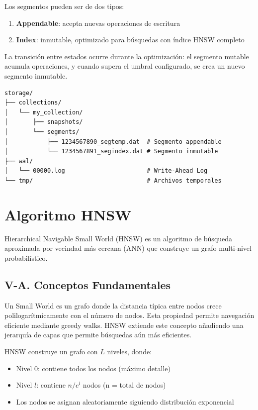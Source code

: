 \documentclass[conference]{IEEEtran}
\begin{document}
Los segmentos pueden ser de dos tipos:

\begin{enumerate}
    \item \textbf{Appendable}: acepta nuevas operaciones de escritura
    \item \textbf{Index}: inmutable, optimizado para búsquedas con índice HNSW completo
\end{enumerate}

La transición entre estados ocurre durante la optimización: el segmento mutable acumula operaciones, y cuando supera el umbral configurado, se crea un nuevo segmento inmutable.

\begin{lstlisting}[caption={Estructura de archivos en disco}]
storage/
├── collections/
│   └── my_collection/
│       ├── snapshots/
│       └── segments/
│           ├── 1234567890_segtemp.dat  # Segmento appendable
│           └── 1234567891_segindex.dat # Segmento inmutable
├── wal/
│   └── 00000.log                       # Write-Ahead Log
└── tmp/                                # Archivos temporales
\end{lstlisting}

\section{Algoritmo HNSW}
\label{sec:hnsw}

Hierarchical Navigable Small World (HNSW) es un algoritmo de búsqueda aproximada por vecindad más cercana (ANN) que construye un grafo multi-nivel probabilístico.

\subsection{V-A. Conceptos Fundamentales}

Un Small World es un grafo donde la distancia típica entre nodos crece polilogarítmicamente con el número de nodos. Esta propiedad permite navegación eficiente mediante greedy walks. HNSW extiende este concepto añadiendo una jerarquía de capas que permite búsquedas aún más eficientes.

HNSW construye un grafo con $L$ niveles, donde:

\begin{itemize}
    \item Nivel 0: contiene todos los nodos (máximo detalle)
    \item Nivel $l$: contiene $n / e^l$ nodos (n = total de nodos)
    \item Los nodos se asignan aleatoriamente siguiendo distribución exponencial
\end{itemize}
\end{document}
